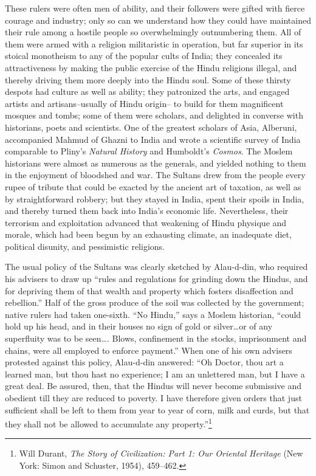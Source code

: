 These rulers were often men of ability, and their followers were gifted with fierce courage and industry; only so can we understand how they could have maintained their rule among a hostile people so overwhelmingly outnumbering them. All of them were armed with a religion militaristic in operation, but far superior in its stoical monotheism to any of the popular cults of India; they concealed its attractiveness by making the public exercise of the Hindu religions illegal, and thereby driving them more deeply into the Hindu soul. Some of these thirsty despots had culture as well as ability; they patronized the arts, and engaged artists and artisans–usually of Hindu origin– to build for them magnificent mosques and tombs; some of them were scholars, and delighted in converse with historians, poets and scientists. One of the greatest scholars of Asia, Alberuni, accompanied Mahmud of Ghazni to India and wrote a scientific survey of India comparable to Pliny’s \textit{Natural History} and Humboldt’s \textit{Cosmos}. The Moslem historians were almost as numerous as the generals, and yielded nothing to them in the enjoyment of bloodshed and war. The Sultans drew from the people every rupee of tribute that could be exacted by the ancient art of taxation, as well as by straightforward robbery; but they stayed in India, spent their spoils in India, and thereby turned them back into India’s economic life. Nevertheless, their terrorism and exploitation advanced that weakening of Hindu physique and morale, which had been begun by an exhausting climate, an inadequate diet, political disunity, and pessimistic religions. 

The usual policy of the Sultans was clearly sketched by Alau-d-din, who required his advisers to draw up “rules and regulations for grinding down the Hindus, and for depriving them of that wealth and property which fosters disaffection and rebellion.” Half of the gross produce of the soil was collected by the government; native rulers had taken one-sixth. “No Hindu,” says a Moslem historian, “could hold up his head, and in their houses no sign of gold or silver…or of any superfluity was to be seen…. Blows, confinement in the stocks, imprisonment and chains, were all employed to enforce payment.” When one of his own advisers protested against this policy, Alau-d-din answered: “Oh Doctor, thou art a learned man, but thou hast no experience; I am an unlettered man, but I have a great deal. Be assured, then, that the Hindus will never become submissive and obedient till they are reduced to poverty. I have therefore given orders that just sufficient shall be left to them from year to year of corn, milk and curds, but that they shall not be allowed to accumulate any property.”\footnote{Will Durant, \textit{The Story of Civilization: Part 1: Our Oriental Heritage} (New York: Simon and Schuster, 1954), 459--462.} 

